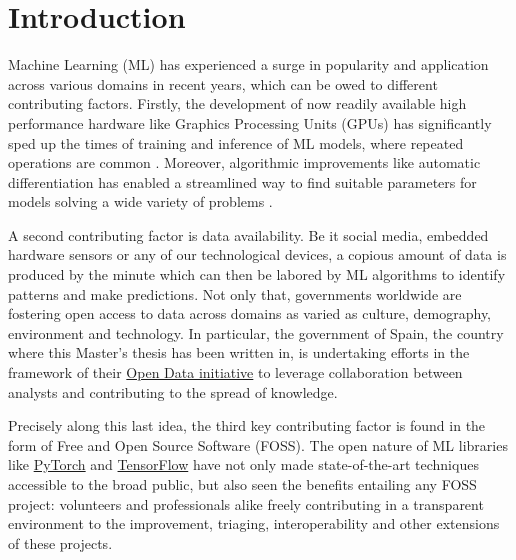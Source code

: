 \documentclass[12pt]{report} %
\begin{document}
\newpage %
\thispagestyle{empty}
\mbox{}


\clearpage
{} %

\chapter{Introduction}

Machine Learning (ML) has experienced a surge in popularity and application across various 
domains in recent years, which can be owed to different contributing factors.
Firstly, the development of now readily available high performance hardware like
Graphics Processing Units (GPUs) has significantly sped up the times of training 
and inference of ML models, where 
repeated operations are common \cite{oh2004gpu}. 
Moreover, algorithmic improvements like automatic differentiation has enabled a streamlined
way to find suitable parameters for models solving a wide variety of problems 
\cite{baydin2018automatic}.

A second contributing factor is data availability. Be it social media,  
embedded hardware sensors or any of our technological devices, a copious amount of data 
is produced
by the minute which can then be labored by ML algorithms to identify patterns and
make predictions. Not only that, governments worldwide are fostering open access to 
data across domains as varied as culture, demography, environment and technology.
In particular, the government of Spain, the country where this Master's thesis has been
written in, is undertaking efforts in the framework of their
\href{https://datos.gob.es/en}{Open Data initiative} to leverage collaboration between 
analysts and contributing to the spread of knowledge.

Precisely along this last idea, the third key contributing factor is found in the form
of Free and Open Source Software (FOSS). The open nature of ML libraries like 
\href{https://pytorch.org/}{PyTorch} and \href{https://www.tensorflow.org/}{TensorFlow} 
have not only made state-of-the-art
techniques accessible to the broad public, but also seen the benefits entailing any FOSS
project: volunteers and professionals alike freely 
contributing in a transparent environment 
to the improvement, triaging, interoperability and other extensions of these projects.
\end{document}
